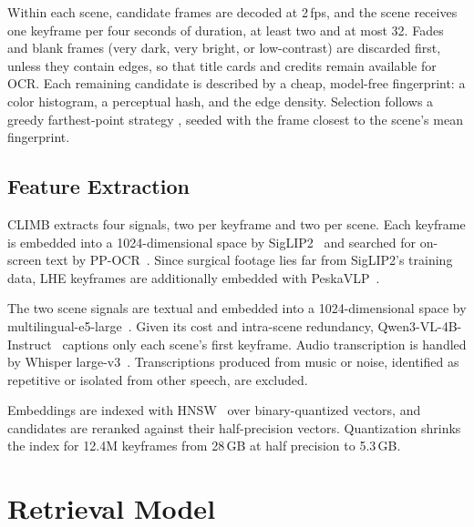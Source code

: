 \documentclass{llncs}
\begin{document}
Within each scene, candidate frames are decoded at 2\,fps, and the scene receives one keyframe per four seconds of duration, at least two and at most 32.
Fades and blank frames (very dark, very bright, or low-contrast) are discarded first, unless they contain edges, so that title cards and credits remain available for OCR.
Each remaining candidate is described by a cheap, model-free fingerprint: a color histogram, a perceptual hash, and the edge density.
Selection follows a greedy farthest-point strategy \cite{gonzalez1985}, seeded with the frame closest to the scene's mean fingerprint.

\subsection{Feature Extraction}
CLIMB extracts four signals, two per keyframe and two per scene. Each keyframe is embedded into a 1024-dimensional space by SigLIP2~\cite{siglip2} and searched for on-screen text by PP-OCR~\cite{ppocr6}.
Since surgical footage lies far from SigLIP2's training data, LHE keyframes are additionally embedded with PeskaVLP~\cite{peska}.

The two scene signals are textual and embedded into a 1024-dimensional space by multilingual-e5-large~\cite{e5large}.
Given its cost and intra-scene redundancy, Qwen3-VL-4B-Instruct~\cite{qwen} captions only each scene's first keyframe. 
Audio transcription is handled by Whisper large-v3~\cite{whisper}. Transcriptions produced from music or noise, identified as repetitive or isolated from other speech, are excluded. 


Embeddings are indexed with HNSW~\cite{hnsw} over binary-quantized vectors, and candidates are reranked against their half-precision vectors.
Quantization shrinks the index for 12.4M keyframes from 28\,GB at half precision to 5.3\,GB.

\section{Retrieval Model}
\end{document}
